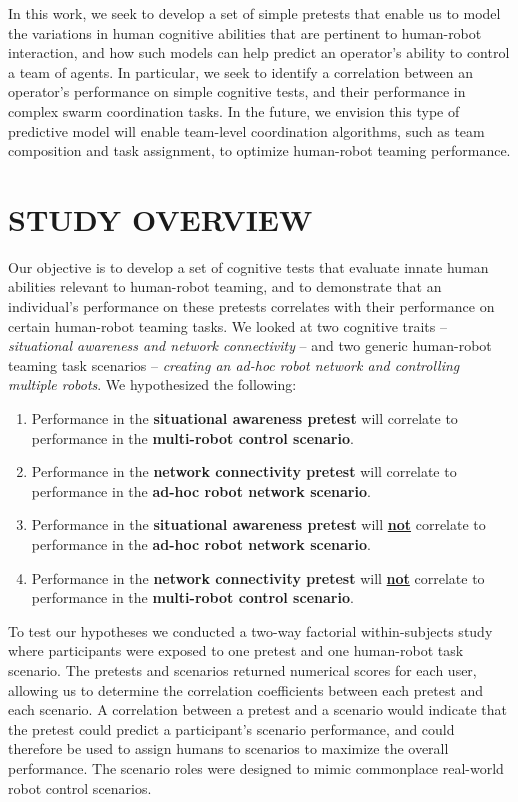 \documentclass[letterpaper, 10 pt, conference]{ieeeconf}  %
\begin{document}
In this work, we seek to develop a set of simple pretests that enable us to model the variations in human cognitive abilities that are pertinent to human-robot interaction, and how such models can help predict an operator’s ability to control a team of agents.  In particular, we seek to identify a correlation between an operator’s performance on simple cognitive tests, and their performance in complex swarm coordination tasks.  In the future, we envision this type of predictive model will enable team-level coordination algorithms, such as team composition and task assignment, to optimize human-robot teaming performance.

\section{STUDY OVERVIEW}

Our objective is to develop a set of cognitive tests that evaluate innate human abilities relevant to human-robot teaming, and to demonstrate that an individual's performance on these pretests correlates with their performance on certain human-robot teaming tasks. We looked at two cognitive traits -- \textit{situational awareness and network connectivity} -- and two generic human-robot teaming task scenarios -- \textit{creating an ad-hoc robot network and controlling multiple robots}. We hypothesized the following:

\begin{enumerate}
    \item Performance in the \textbf{situational awareness pretest} will correlate to performance in the \textbf{multi-robot control scenario}.
    \item Performance in the \textbf{network connectivity pretest} will correlate to performance in the \textbf{ad-hoc robot network scenario}.
    \item Performance in the \textbf{situational awareness pretest} will \underline{\textbf{not}} correlate to performance in the \textbf{ad-hoc robot network scenario}.
    \item Performance in the \textbf{network connectivity pretest} will \underline{\textbf{not}} correlate to performance in the \textbf{multi-robot control scenario}.
\end{enumerate}

To test our hypotheses we conducted a two-way factorial within-subjects study where participants were exposed to one pretest and one human-robot task scenario. The pretests and scenarios returned numerical scores for each user, allowing us to determine the correlation coefficients between each pretest and each scenario. A correlation between a pretest and a scenario would indicate that the pretest could predict a participant's scenario performance, and could therefore be used to assign humans to scenarios to maximize the overall performance. The scenario roles were designed to mimic commonplace real-world robot control scenarios.
\end{document}
